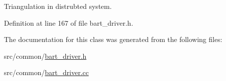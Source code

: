 Triangulation in distrubted system. 



Definition at line 167 of file bart\+\_\+driver.\+h.



The documentation for this class was generated from the following files\+:\begin{DoxyCompactItemize}
\item 
src/common/\hyperlink{bart__driver_8h}{bart\+\_\+driver.\+h}\item 
src/common/\hyperlink{bart__driver_8cc}{bart\+\_\+driver.\+cc}\end{DoxyCompactItemize}
